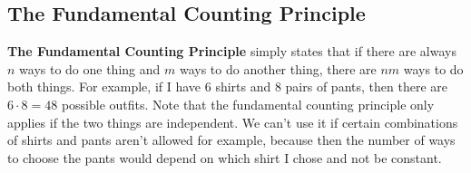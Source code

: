 \documentclass[twocolumn]{article}
\begin{document}
\subsection*{The Fundamental Counting Principle}
\textbf{The Fundamental Counting Principle} simply states that if there are 
always $n$ ways to do one thing and $m$ ways to do another thing, there are $nm$ 
ways to do both things. For example, if I have $6$ shirts and $8$ pairs of 
pants, then there are $6 \cdot 8 = 48$ possible outfits. Note that the 
fundamental counting principle only applies if the two things are independent.  
We can't use it if certain combinations of shirts and pants aren't allowed for 
example, because then the number of ways to choose the pants would depend on 
which shirt I chose and not be constant.
\end{document}
